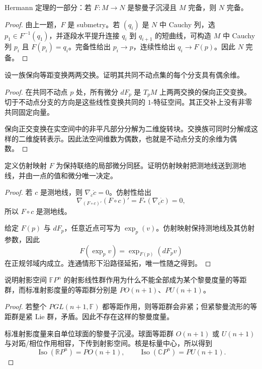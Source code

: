\documentclass[11pt,a4paper,openany]{ctexbook}
\numberwithin{equation}{chapter}
\begin{document}
\begin{problem}
Hermann 定理的一部分：若 \(F\colon M\to N\) 是黎曼子沉浸且 \(M\) 完备，则 \(N\) 完备。
\end{problem}
\begin{proof}
由上一题，\(F\) 是 submetry。若 \((q_i)\) 是 \(N\) 中 Cauchy 列，选 \(p_1\in F^{-1}(q_1)\)，并逐段水平提升连接 \(q_i\) 到 \(q_{i+1}\) 的短曲线，可构造 \(M\) 中 Cauchy 列 \(p_i\) 且 \(F(p_i)=q_i\)。完备性给出 \(p_i\to p\)，连续性给出 \(q_i\to F(p)\)。因此 \(N\) 完备。
\end{proof}

\begin{problem}
设一族保向等距变换两两交换。证明其共同不动点集的每个分支具有偶余维。
\end{problem}
\begin{proof}
在共同不动点 \(p\) 处，所有微分 \(dF_p\) 是 \(T_pM\) 上两两交换的保向正交变换。切于不动点分支的方向是这些线性变换共同的 \(1\)-特征空间。其正交补上没有非零共同固定向量。

保向正交变换在实空间中的非平凡部分分解为二维旋转块。交换族可同时分解成这样的二维旋转表示。因此法空间维数为偶数，也就是不动点分支的余维为偶数。
\end{proof}

\begin{problem}
定义仿射映射 \(F\) 为保持联络的局部微分同胚。证明仿射映射把测地线送到测地线，并由一点的值和微分唯一决定。
\end{problem}
\begin{proof}
若 \(c\) 是测地线，则 \(\nabla_{\dot c}\dot c=0\)。仿射性给出
\[
\nabla_{(F\circ c)'}(F\circ c)'=F_*(\nabla_{\dot c}\dot c)=0,
\]
所以 \(F\circ c\) 是测地线。

给定 \(F(p)\) 与 \(dF_p\)，任意近点可写为 \(\exp_p(v)\)。仿射映射保持测地线及其仿射参数，因此
\[
F(\exp_p v)=\exp_{F(p)}(dF_pv)
\]
在正规邻域内成立。连通情形下沿路径延拓，唯一性随之得到。
\end{proof}

\begin{problem}
说明射影空间 \(\mathbb FP^n\) 的射影线性群作用为什么不能全部成为某个黎曼度量的等距群，而标准射影度量的等距群分别是 \(PO(n+1)\)、\(PU(n+1)\)。
\end{problem}
\begin{proof}
若整个 \(PGL(n+1,\mathbb F)\) 都等距作用，则等距群会非紧；但紧黎曼流形的等距群是紧 Lie 群，矛盾。因此不存在这样的黎曼度量。

标准射影度量来自单位球面的黎曼子沉浸。球面等距群 \(O(n+1)\) 或 \(U(n+1)\) 与对跖/相位作用相容，下传到射影空间。核是标量中心，所以得到
\[
\operatorname{Iso}(\mathbb RP^n)=PO(n+1),\qquad
\operatorname{Iso}(\mathbb CP^n)=PU(n+1).
\]
\end{proof}
\end{document}
